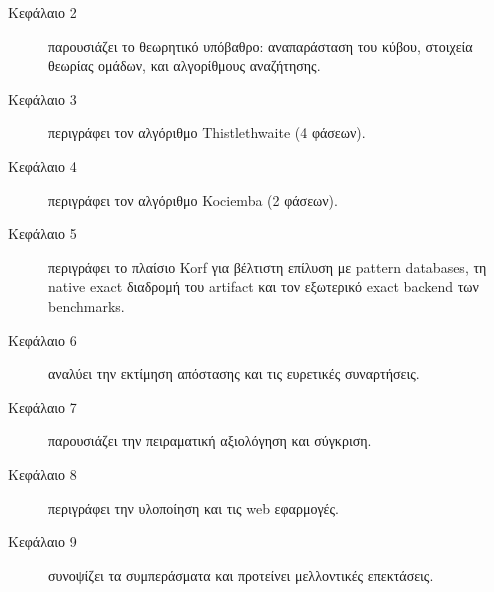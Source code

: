 \begin{description}
    \item[Κεφάλαιο 2] παρουσιάζει το θεωρητικό υπόβαθρο: αναπαράσταση του κύβου, στοιχεία θεωρίας ομάδων, και αλγορίθμους αναζήτησης.

    \item[Κεφάλαιο 3] περιγράφει τον αλγόριθμο Thistlethwaite (4 φάσεων).

    \item[Κεφάλαιο 4] περιγράφει τον αλγόριθμο Kociemba (2 φάσεων).

    \item[Κεφάλαιο 5] περιγράφει το πλαίσιο Korf για βέλτιστη επίλυση με pattern databases, τη native exact διαδρομή του artifact και τον εξωτερικό exact backend των benchmarks.

    \item[Κεφάλαιο 6] αναλύει την εκτίμηση απόστασης και τις ευρετικές συναρτήσεις.

    \item[Κεφάλαιο 7] παρουσιάζει την πειραματική αξιολόγηση και σύγκριση.

    \item[Κεφάλαιο 8] περιγράφει την υλοποίηση και τις web εφαρμογές.

    \item[Κεφάλαιο 9] συνοψίζει τα συμπεράσματα και προτείνει μελλοντικές επεκτάσεις.
\end{description}
